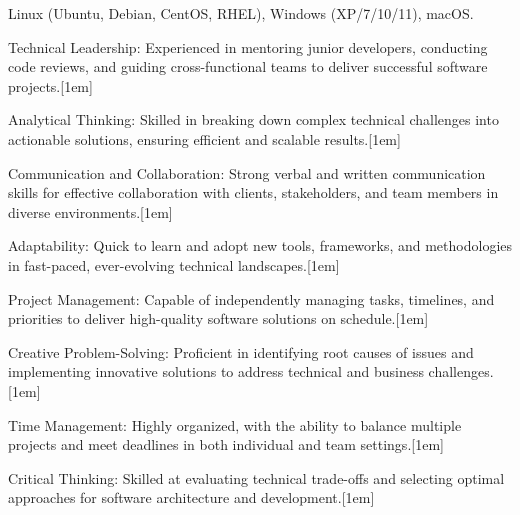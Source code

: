\begin{cvparagraph}
  Linux (Ubuntu, Debian, CentOS, RHEL),
  Windows (XP/7/10/11),
  macOS.
\end{cvparagraph}


\begin{cvskills}

  \cvskill
  {Technical Leadership:}
  {Experienced in mentoring junior developers,
  conducting code reviews, and guiding cross-functional
  teams to deliver successful software projects.}[1em]

  \cvskill
  {Analytical Thinking:}
  {Skilled in breaking down complex technical
   challenges into actionable solutions,
   ensuring efficient and scalable results.}[1em]

  \cvskill
   {Communication and Collaboration:}
   {Strong verbal and written communication skills
    for effective collaboration with clients,
    stakeholders, and team members in
    diverse environments.}[1em]

  \cvskill
   {Adaptability:}
   {Quick to learn and adopt new tools,
   frameworks, and methodologies in fast-paced,
   ever-evolving technical landscapes.}[1em]

  \cvskill
   {Project Management:}
   {Capable of independently managing tasks,
    timelines, and priorities to deliver high-quality
    software solutions on schedule.}[1em]


  \cvskill
   {Creative Problem-Solving:}
   {Proficient in identifying root causes of
    issues and implementing innovative solutions
    to address technical and business challenges.}[1em]

  \cvskill
   {Time Management:}
   {Highly organized, with the ability to balance
    multiple projects and meet deadlines in both
    individual and team settings.}[1em]

  \cvskill
   {Critical Thinking:}
   {Skilled at evaluating technical trade-offs and
    selecting optimal approaches for software
    architecture and development.}[1em]

\end{cvskills}

